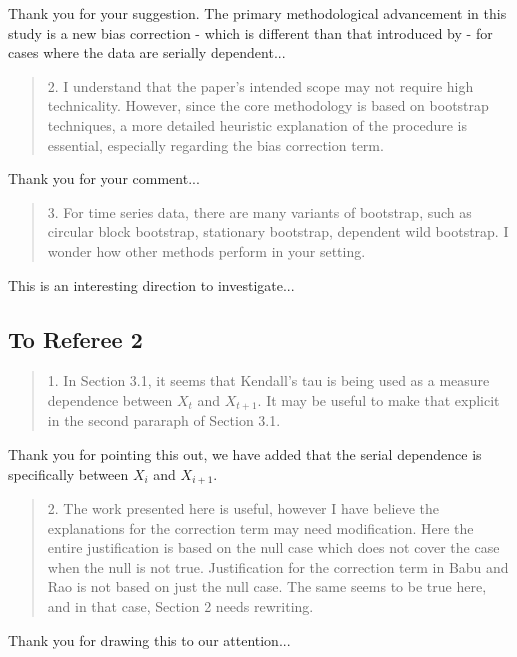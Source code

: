 \documentclass[12pt]{article}
\newenvironment{comment}%
{\begin{quotation}\noindent\small\it\color{darkblue}\ignorespaces%
}{\end{quotation}}
\begin{document}
Thank you for your suggestion. The primary methodological 
advancement in this study is a new bias correction - which is different than 
that introduced by \citet{babu2004goodness} - for cases where the data are
serially dependent...



\begin{comment}
2. I understand that the paper’s intended scope may not require high 
technicality. However,
since the core methodology is based on bootstrap techniques, a more detailed 
heuristic
explanation of the procedure is essential, especially regarding the bias 
correction term.
\end{comment}

Thank you for your comment...



\begin{comment}
3. For time series data, there are many variants of bootstrap, such as circular 
block bootstrap,
stationary bootstrap, dependent wild bootstrap. I wonder how other methods 
perform in
your setting.
\end{comment} 

This is an interesting direction to investigate...



\subsection*{To Referee 2}

\begin{comment}
1. In Section 3.1, it seems that Kendall's tau is being used as a measure
dependence between $X_t$ and $X_{t+1}$. It may be useful to make that explicit 
in the
second pararaph of Section 3.1.
\end{comment}

Thank you for pointing this out, we have added that the
serial dependence is specifically between $X_i$ and $X_{i+1}$.




\begin{comment}
2. The work presented here is useful, however I have believe the explanations
for the correction term may need modification. Here the entire justification is
based on the null case which does not cover the case when the null is not true.
Justification for the correction term in Babu and Rao is not based on just the
null case. The same seems to be true here, and in that case, Section 2 needs
rewriting.
\end{comment}

Thank you for drawing this to our attention...







\end{document}
